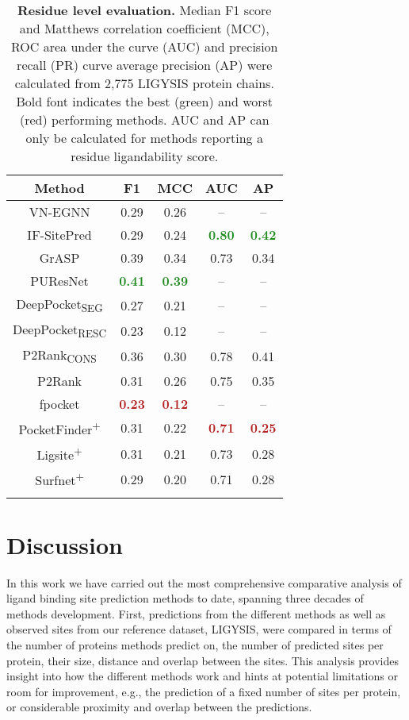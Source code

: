 \begin{longtable}[c]{|c|c|c|c|c|}
\hline
\textbf{Method}         & \textbf{F1}   & \textbf{MCC}  & \textbf{AUC}  & \textbf{AP}   \\ \hline
\endfirsthead
%
\endhead
%
VN-EGNN        & 0.29 & 0.26 & --    & --    \\ \hline
IF-SitePred    & 0.29 & 0.24 & \textbf{\textcolor{forestgreen}{0.80}}  & \textbf{\textcolor{forestgreen}{0.42}} \\ \hline
GrASP          & 0.39 & 0.34 & 0.73 & 0.34 \\ \hline
PUResNet       & \textbf{\textcolor{forestgreen}{0.41}} & \textbf{\textcolor{forestgreen}{0.39}} & --    & --    \\ \hline
DeepPocket\textsubscript{SEG}  & 0.27 & 0.21 & --    & --    \\ \hline
DeepPocket\textsubscript{RESC} & 0.23 & 0.12 & --    & --    \\ \hline
P2Rank\textsubscript{CONS}     & 0.36 & 0.30  & 0.78 & 0.41 \\ \hline
P2Rank         & 0.31 & 0.26 & 0.75 & 0.35 \\ \hline
fpocket        & \textbf{\textcolor{firebrick}{0.23}} & \textbf{\textcolor{firebrick}{0.12}} & --    & --    \\ \hline
PocketFinder\textsuperscript{+}  & 0.31 & 0.22 & \textbf{\textcolor{firebrick}{0.71}} & \textbf{\textcolor{firebrick}{0.25}} \\ \hline
Ligsite\textsuperscript{+}       & 0.31 & 0.21 & 0.73 & 0.28 \\ \hline
Surfnet\textsuperscript{+}       & 0.29 & 0.20  & 0.71 & 0.28 \\ \hline
\caption[Residue level evaluation]{\textbf{Residue level evaluation.} Median F1 score and Matthews correlation coefficient (MCC), ROC area under the curve (AUC) and precision recall (PR) curve average precision (AP) were calculated from 2,775 LIGYSIS protein chains. Bold font indicates the best (green) and worst (red) performing methods. AUC and AP can only be calculated for methods reporting a residue ligandability score.}
\label{tab:residue_level_benchmark}\\
\end{longtable}

\section{Discussion}

In this work we have carried out the most comprehensive comparative analysis of ligand binding site prediction methods to date, spanning three decades of methods development. First, predictions from the different methods as well as observed sites from our reference dataset, LIGYSIS, were compared in terms of the number of proteins methods predict on, the number of predicted sites per protein, their size, distance and overlap between the sites. This analysis provides insight into how the different methods work and hints at potential limitations or room for improvement, e.g., the prediction of a fixed number of sites per protein, or considerable proximity and overlap between the predictions.


